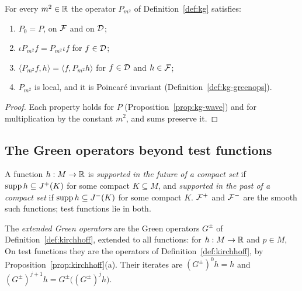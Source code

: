 \begin{lemma}\label{lem:kg}
For every $m^2\in\mathbb R$ the operator $P_{m^2}$ of Definition~\ref{def:kg} satisfies:
\begin{enumerate}[label=(\alph*),leftmargin=2.5em]
\item $P_0=P$, on $\mathcal F$ and on $\mathcal D$;
\item $\iota P_{m^2}f=P_{m^2}\iota f$ for $f\in\mathcal D$;
\item $\langle P_{m^2}f,h\rangle=\langle f,P_{m^2}h\rangle$ for $f\in\mathcal D$ and $h\in\mathcal F$;
\item $P_{m^2}$ is local, and it is Poincar\'e invariant (Definition~\ref{def:kg-greenops}).
\end{enumerate}
\end{lemma}
\begin{proof}
Each property holds for $P$ (Proposition~\ref{prop:kg-wave}) and for multiplication by the constant
$m^2$, and sums preserve it.
\end{proof}

\subsection{The Green operators beyond test functions}\label{sec:kg-extend}

\noindent{}

\begin{definition}\label{def:kg-supported}
A function $h:M\to\mathbb R$ is \emph{supported in the future of a compact set} if $\operatorname{supp} h\subseteq J^+(K)$
for some compact $K\subseteq M$, and \emph{supported in the past of a compact set} if
$\operatorname{supp} h\subseteq J^-(K)$ for some compact $K$. $\mathcal F^+$ and $\mathcal F^-$ are the smooth such functions;
test functions lie in both.

The \emph{extended Green operators} are the Green operators $G^\pm$ of
Definition~\ref{def:kirchhoff}, extended to all functions: for $h:M\to\mathbb R$ and $p\in M$,
  On test functions they are the operators of Definition~\ref{def:kirchhoff}, by
Proposition~\ref{prop:kirchhoff}(a). Their iterates are $(G^\pm)^0h=h$ and
$(G^\pm)^{j+1}h=G^\pm\bigl((G^\pm)^jh\bigr)$.
\end{definition}

